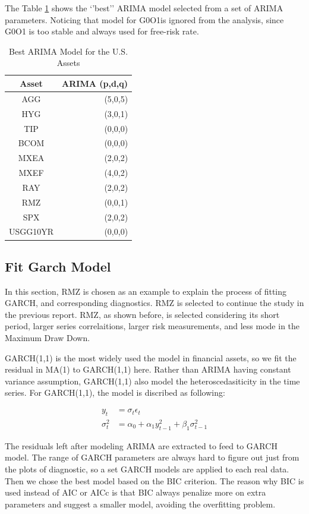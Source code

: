 \documentclass[12pt]{article}
\begin{document}
The Table \ref{table:BestArima} shows the `'best'' ARIMA model selected from a set of ARIMA parameters. Noticing that model for G0O1is ignored from the analysis, since G0O1 is too stable and always used for free-risk rate.

\begin{table}[!h]
\caption{Best ARIMA Model for the U.S. Assets }
\centering 
\begin{tabular}{ | c || r | } 
 \hline
Asset & ARIMA (p,d,q) \\
  \hline \hline
AGG & (5,0,5) \\ 
HYG & (3,0,1) \\ 
TIP &  (0,0,0)\\ 
BCOM & (0,0,0)\\ 
MXEA & (2,0,2) \\ 
MXEF & (4,0,2)\\ 
RAY &  (2,0,2)\\ 
RMZ & (0,0,1) \\ 
SPX & (2,0,2) \\ 
USGG10YR & (0,0,0) \\
 \hline
\end{tabular}
\label{table:BestArima}
\end{table}

\subsection{Fit Garch Model}
In this section,  RMZ is chosen as an example to explain the process of fitting GARCH, and corresponding diagnostics. RMZ is selected to continue the study in the previous report. RMZ, as shown before, is selected considering its short period, larger series correlaitions, larger risk measurements, and less mode in the Maximum Draw Down.

GARCH(1,1) is the most widely used the model in financial assets, so we fit the residual in MA(1) to GARCH(1,1) here. Rather than ARIMA having constant variance assumption, GARCH(1,1) also model the heteroscedasiticity in the time series.  For GARCH(1,1), the model is discribed as following:

\begin{align*}
y_t & = \sigma_t \epsilon_t\\
\sigma_t^2 & = \alpha_0+ \alpha_1 y_{t-1}^2 +\beta_1\sigma_{t-1}^2
\end{align*}


The residuals left after modeling ARIMA are extracted to feed to GARCH model. The range of GARCH parameters are always hard to figure out just from the plots of diagnostic, so a set GARCH models are applied to each real data. Then we chose the best model based on the BIC criterion. The reason why BIC is used instead of AIC or AICc is that BIC always penalize more on extra parameters and suggest a smaller model, avoiding the overfitting problem.
\end{document}
